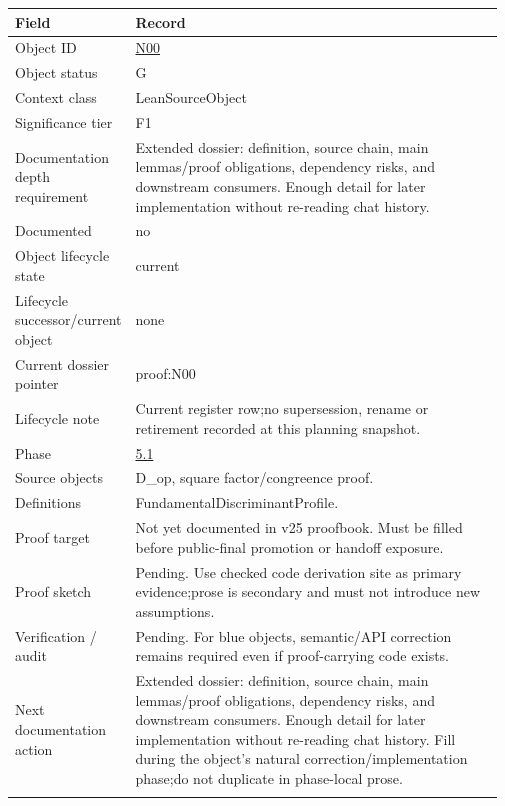 \begin{longtable}{L{0.16\linewidth} L{0.81\linewidth}}
\hline
\textbf{Field} & \textbf{Record}\\
\hline
Object ID & \hyperlink{object-row-N00}{N00}\\
\hline\addlinespace[0.20em]
Object status & G\\
\hline\addlinespace[0.20em]
Context class & LeanSourceObject\\
\hline\addlinespace[0.20em]
Significance tier & F1\\
\hline\addlinespace[0.20em]
Documentation depth requirement & Extended dossier: definition, source chain, main lemmas/\allowbreak{}proof obligations, dependency risks, and downstream consumers. Enough detail for later implementation without re-reading chat history.\\
\hline\addlinespace[0.20em]
Documented & no\\
\hline\addlinespace[0.20em]
Object lifecycle state & current\\
\hline\addlinespace[0.20em]
Lifecycle successor/\allowbreak{}current object & none\\
\hline\addlinespace[0.20em]
Current dossier pointer & proof:N00\\
\hline\addlinespace[0.20em]
Lifecycle note & Current register row;\newline no supersession, rename or retirement recorded at this planning snapshot.\\
\hline\addlinespace[0.20em]
Phase & \hyperlink{phase-row-5-1}{5.1}\\
\hline\addlinespace[0.20em]
Source objects & D\_op, square factor/\allowbreak{}congreence proof.\\
\hline\addlinespace[0.20em]
Definitions & FundamentalDiscriminantProfile.\\
\hline\addlinespace[0.20em]
Proof target & Not yet documented in v25 proofbook. Must be filled before public-final promotion or handoff exposure.\\
\hline\addlinespace[0.20em]
Proof sketch & Pending. Use checked code derivation site as primary evidence;\newline prose is secondary and must not introduce new assumptions.\\
\hline\addlinespace[0.20em]
Verification /\allowbreak{} audit & Pending. For blue objects, semantic/\allowbreak{}API correction remains required even if proof-carrying code exists.\\
\hline\addlinespace[0.20em]
Next documentation action & Extended dossier: definition, source chain, main lemmas/\allowbreak{}proof obligations, dependency risks, and downstream consumers. Enough detail for later implementation without re-reading chat history. Fill during the object's natural correction/\allowbreak{}implementation phase;\newline do not duplicate in phase-local prose.\\
\hline\addlinespace[0.20em]
\end{longtable}
